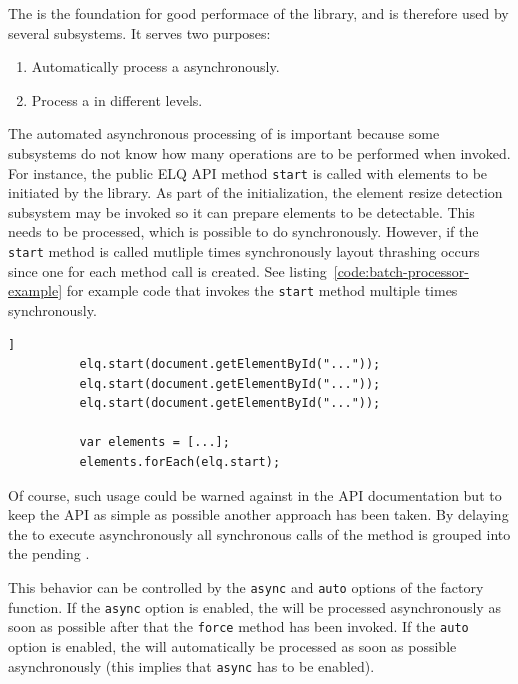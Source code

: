 \documentclass[a4paper,11pt]{kth-mag}
\newcommand{\code}[1]{\texttt{#1}}
\begin{document}
        The  is the foundation for good performace of the library, and is therefore used by several subsystems.
        It serves two purposes:
        \begin{enumerate}
          \item Automatically process a  asynchronously.
          \item Process a  in different levels.
        \end{enumerate}
        The automated asynchronous processing of  is important because some subsystems do not know how many operations are to be performed when invoked.
        For instance, the public \gls{ELQ} \gls{API} method \code{start} is called with \glspl{element} to be initiated by the library.
        As part of the initialization, the element resize detection subsystem may be invoked so it can prepare \glspl{element} to be detectable.
        This needs to be  processed, which is possible to do synchronously.
        However, if the \code{start} method is called mutliple times synchronously \gls{layout thrashing} occurs since one  for each method call is created.
        See listing~\ref{code:batch-processor-example} for example code that invokes the \code{start} method multiple times synchronously.
        \begin{lstlisting}[gobble=10,label={code:batch-processor-example},caption={Example of multiple synchronous calls to the \gls{ELQ} \code{start} method.},captionpos=b]]
          elq.start(document.getElementById("..."));
          elq.start(document.getElementById("..."));
          elq.start(document.getElementById("..."));

          var elements = [...];
          elements.forEach(elq.start);
        \end{lstlisting}
        Of course, such usage could be warned against in the \gls{API} documentation but to keep the \gls{API} as simple as possible another approach has been taken.
        By delaying the  to execute asynchronously all synchronous calls of the method is grouped into the pending .
        
        This behavior can be controlled by the \code{async} and \code{auto} options of the  factory function.
        If the \code{async} option is enabled, the  will be processed asynchronously as soon as possible after that the \code{force} method has been invoked.
        If the \code{auto} option is enabled, the  will automatically be processed as soon as possible asynchronously (this implies that \code{async} has to be enabled).
\end{document}
